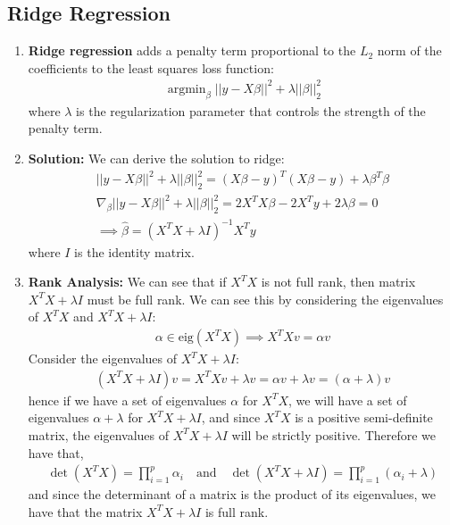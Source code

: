 \documentclass[letterpaper, 11pt]{article}
\newcommand{\1}{\mathds{1}}	%
\DeclareMathOperator*{\argmin}{argmin}		%
\theoremstyle{definition}
\begin{document}
\subsection{Ridge Regression}
\begin{enumerate}
    \item \textbf{Ridge regression} adds a penalty term proportional to the $L_2$ norm of the coefficients to the least squares loss function:
    \begin{align}
        \argmin_{\beta} ||y - X \beta||^2 + \lambda ||\beta||_2^2
    \end{align}
    where $\lambda$ is the regularization parameter that controls the strength of the penalty term.
    \item \textbf{Solution:} We can derive the solution to ridge:
    \begin{align}
        ||y - X \beta||^2 + \lambda ||\beta||_2^2 = (X\beta - y)^T(X\beta - y) + \lambda \beta^T \beta \\
        \nabla_{\beta} ||y - X \beta||^2 + \lambda ||\beta||_2^2 = 2 X^T X \beta - 2 X^T y + 2 \lambda \beta = 0 \\
        \implies \hat{\beta} = (X^T X + \lambda I)^{-1} X^T y
    \end{align}
    where $I$ is the identity matrix. 
    \item \textbf{Rank Analysis:} We can see that if $X^TX$ is not full rank, then matrix $X^TX + \lambda I$ must be full rank. 
    We can see this by considering the eigenvalues of $X^TX$ and $X^TX + \lambda I$:
    \begin{align}
        \alpha \in \text{eig}(X^TX) \implies X^TX v = \alpha v
    \end{align}
    Consider the eigenvalues of $X^TX + \lambda I$:
    \begin{align}
        (X^TX + \lambda I) v = X^TX v + \lambda v = \alpha v + \lambda v = (\alpha + \lambda) v 
    \end{align}
    hence if we have a set of eigenvalues $\alpha$ for $X^TX$, we will have a set of eigenvalues $\alpha + \lambda$ for $X^TX + \lambda I$, 
    and since $X^TX$ is a positive semi-definite matrix, the eigenvalues of $X^TX + \lambda I$ will be strictly positive.
    Therefore we have that,
    \begin{align}
        \det(X^TX) = \prod_{i=1}^{p} \alpha_i \quad \text{and} \quad \det(X^TX + \lambda I) = \prod_{i=1}^{p} (\alpha_i + \lambda)
    \end{align}
    and since the determinant of a matrix is the product of its eigenvalues, we have that the matrix $X^TX + \lambda I$ is full rank. \\ \\ 

\end{enumerate}
\end{document}
